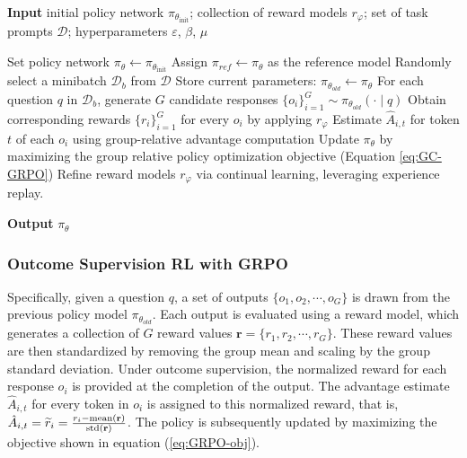 \begin{itemize}[topsep=0pt]
\begin{itemize}[topsep=0pt]
\begin{algorithm}[t]
  \small
  \caption{Iterative Group Relative Policy Optimization}
  \textbf{Input} initial policy network $\pi_{\theta_{\text{init}}}$; collection of reward models $r_\varphi$; set of task prompts $\mathcal{D}$; 
  hyperparameters $\varepsilon$, $\beta$, $\mu$
  \begin{algorithmic}[1]
    \State Set policy network $\pi_\theta \leftarrow \pi_{\theta_{\text{init}}}$
       \State Assign $\pi_{ref} \leftarrow \pi_{\theta}$ as the reference model
      \State Randomly select a minibatch $\mathcal{D}_b$ from $\mathcal{D}$
      \State Store current parameters: $\pi_{\theta_{old}} \leftarrow \pi_{\theta}$ 
      \State For each question $q$ in $\mathcal{D}_b$, generate $G$ candidate responses $\{o_i\}_{i=1}^G \sim \pi_{\theta_{old}} (\cdot \mid q) $
      \State Obtain corresponding rewards $\{r_i\}_{i=1}^{G}$ for every $o_i$ by applying $r_{\varphi}$
      \State Estimate $\hat{A}_{i,t}$ for token $t$ of each $o_i$ using group-relative advantage computation
        \State Update $\pi_{\theta}$ by maximizing the group relative policy optimization objective (Equation \ref{eq:GC-GRPO})
      \EndFor
    \EndFor
    \State Refine reward models $r_\varphi$ via continual learning, leveraging experience replay.
    \EndFor 
  \end{algorithmic}
  \textbf{Output} $\pi_\theta$
  \label{alg:iter-grpo}
\end{algorithm}

\subsubsection{Outcome Supervision RL with GRPO} Specifically, given a question $q$, a set of outputs $\{o_1, o_2, \cdots, o_G\}$ is drawn from the previous policy model $\pi_{\theta_{old}}$. Each output is evaluated using a reward model, which generates a collection of $G$ reward values $\mathbf{r} = \{r_1, r_2, \cdots, r_G\}$. These reward values are then standardized by removing the group mean and scaling by the group standard deviation. Under outcome supervision, the normalized reward for each response $o_i$ is provided at the completion of the output. The advantage estimate $\hat{A}_{i, t}$ for every token in $o_i$ is assigned to this normalized reward, that is, $\hat{A}_{i, t} = \widetilde{r}_i = \frac{r_i- {\rm mean}(\mathbf{r})}{{\rm std}(\mathbf{r})}$. The policy is subsequently updated by maximizing the objective shown in equation (\ref{eq:GRPO-obj}).


\end{itemize}
\end{itemize}
